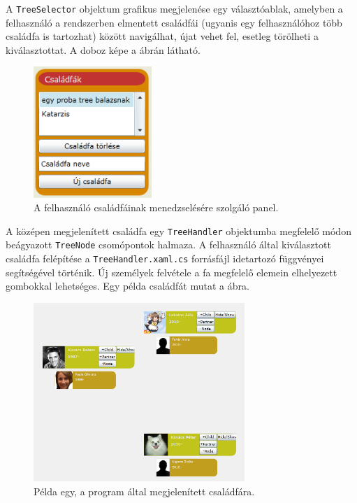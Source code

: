 \bigskip

A \texttt{TreeSelector} objektum grafikus megjelenése egy választóablak, amelyben a felhasználó a rendszerben elmentett családfái (ugyanis egy felhasználóhoz több családfa is tartozhat) között navigálhat, újat vehet fel, esetleg törölheti a kiválasztottat. A doboz képe a  ábrán látható.

\begin{figure}[!ht]
\centering
\includegraphics[width=45mm, keepaspectratio]{figures/csaladfa-panel.png}
\caption{A felhasználó családfáinak menedzselésére szolgáló panel.}
\label{fig:csaladfa_panel}
\end{figure}

\bigskip

A középen megjelenített családfa egy \texttt{TreeHandler} objektumba megfelelő módon beágyazott \texttt{TreeNode} csomópontok halmaza. A felhasználó által kiválasztott családfa felépítése a \texttt{TreeHandler.xaml.cs} forrásfájl idetartozó függvényei segítségével történik. Új személyek felvétele a fa megfelelő elemein elhelyezett gombokkal lehetséges. Egy példa családfát mutat a  ábra.

\begin{figure}[!ht]
\centering
\includegraphics[width=80mm, keepaspectratio]{figures/famtree.png}
\caption{Példa egy, a program által megjelenített családfára.}
\label{fig:alk_tree}
\end{figure}


